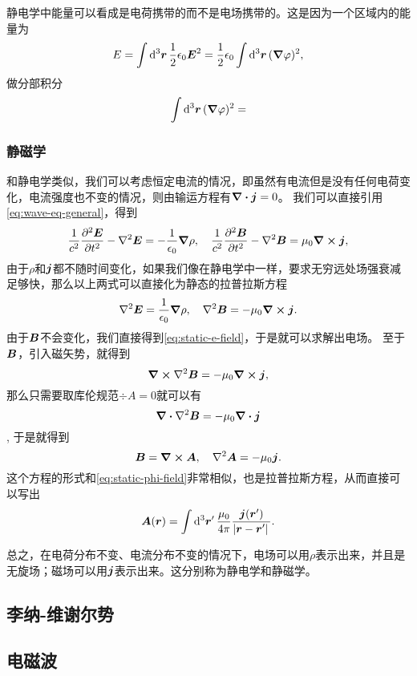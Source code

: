 \documentclass[UTF8, a4paper]{ctexart}
\begin{document}
静电学中能量可以看成是电荷携带的而不是电场携带的。这是因为一个区域内的能量为
\[
    E = \int \dd[3]{\vb*{r}} \frac{1}{2} \epsilon_0 \vb*{E}^2 = \frac{1}{2} \epsilon_0 \int \dd[3]{\vb*{r}} (\grad{\varphi})^2,
\]
做分部积分
\[
    \int \dd[3]{\vb*{r}} (\grad{\varphi})^2 = 
\]

\subsubsection{静磁学}

和静电学类似，我们可以考虑恒定电流的情况，即虽然有电流但是没有任何电荷变化，电流强度也不变的情况，则由输运方程有$\div{\vb*{j}}=0$。
我们可以直接引用\eqref{eq:wave-eq-general}，得到
\[
    \frac{1}{c^2} \pdv[2]{\vb*{E}}{t} - \laplacian{\vb*{E}} = - \frac{1}{\epsilon_0} \grad{\rho} , \quad \frac{1}{c^2} \pdv[2]{\vb*{B}}{t} - \laplacian{\vb*{B}} = \mu_0 \curl{\vb*{j}},
\]
由于$\rho$和$\vb*{j}$都不随时间变化，如果我们像在静电学中一样，要求无穷远处场强衰减足够快，那么以上两式可以直接化为静态的拉普拉斯方程
\[
    \laplacian{\vb*{E}} = \frac{1}{\epsilon_0} \grad{\rho}, \quad \laplacian{\vb*{B}} = - \mu_0 \curl{\vb*{j}}.
\]
由于$\vb*{B}$不会变化，我们直接得到\eqref{eq:static-e-field}，于是就可以求解出电场。
至于$\vb*{B}$，引入磁矢势，就得到
\[
    \curl{\laplacian{\vb*{B}}} = - \mu_0 \curl{\vb*{j}},
\]
那么只需要取库伦规范$\div{A}=0$就可以有
\[
    \div{\laplacian{\vb*{B}}} = - \mu_0 \div{\vb*{j}}
\],
于是就得到
\begin{equation}
    \vb*{B} = \curl{\vb*{A}}, \quad \laplacian{\vb*{A}} = - \mu_0 \vb*{j}.
\end{equation}
这个方程的形式和\eqref{eq:static-phi-field}非常相似，也是拉普拉斯方程，从而直接可以写出
\begin{equation}
    \vb*{A}(\vb*{r}) = \int \dd[3]{\vb*{r}'} \frac{\mu_0}{4\pi} \frac{\vb*{j}(\vb*{r}')}{\abs*{\vb*{r} - \vb*{r}'}}.
    \label{eq:from-j-to-a}
\end{equation}

总之，在电荷分布不变、电流分布不变的情况下，电场可以用$\rho$表示出来，并且是无旋场；磁场可以用$\vb*{j}$表示出来。这分别称为静电学和静磁学。

\subsection{李纳-维谢尔势}

\subsection{电磁波}
\end{document}
